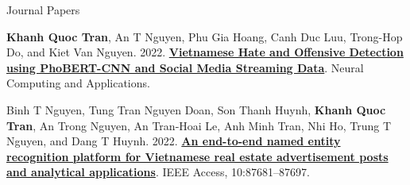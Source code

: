 

\begin{cventries}



  \cventryp
    {Journal Papers} %
    {
      \begin{cvitems} %
        \item {\textbf{Khanh Quoc Tran}, An T Nguyen, Phu Gia Hoang, Canh Duc Luu, Trong-Hop Do, and Kiet Van Nguyen. 2022. \href{https://doi.org/10.1007/s00521-022-07745-w}{\textbf{Vietnamese Hate and Offensive Detection using PhoBERT-CNN and Social Media Streaming Data}}. Neural Computing and Applications.\qonetag{\textcolor{white}{\textsf\bfseries Q1}}  } 
        \item {Binh T Nguyen, Tung Tran Nguyen Doan, Son Thanh Huynh, \textbf{Khanh Quoc Tran}, An Trong Nguyen, An Tran-Hoai Le, Anh Minh Tran, Nhi Ho, Trung T Nguyen, and Dang T Huynh. 2022. \href{https://doi.org/10.1109/ACCESS.2022.3195496}{\textbf{An end-to-end named entity recognition platform for Vietnamese real estate advertisement posts and analytical applications}}. IEEE Access, 10:87681–87697. \qonetag{\textcolor{white}{\textsf\bfseries Q1}}  }
      \end{cvitems}
    }
    

\end{cventries}
